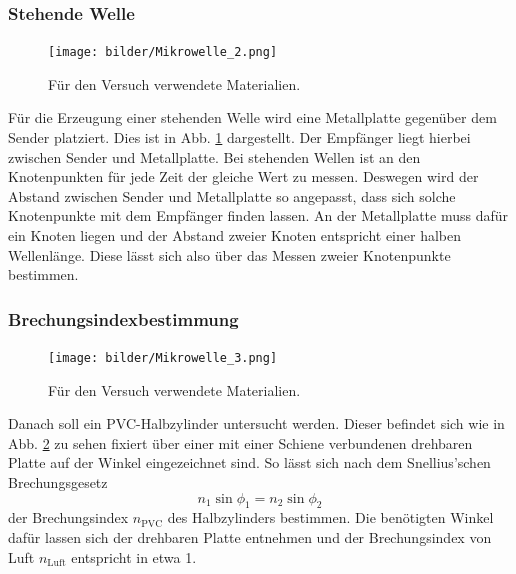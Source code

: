 		\subsubsection*{Stehende Welle}
		\begin{figure}[ht]
			\centering
			\texttt{[image: bilder/Mikrowelle\_2.png]}
			\caption{Für den Versuch verwendete Materialien.\cite{WWU}}
			\label{fig:Aufbau2}	
		\end{figure}
		Für die Erzeugung einer stehenden Welle wird eine Metallplatte gegenüber dem Sender platziert. 
		Dies ist in Abb. \ref{fig:Aufbau2} dargestellt.
		Der Empfänger liegt hierbei zwischen Sender und Metallplatte. 
		Bei stehenden Wellen ist an den Knotenpunkten für jede Zeit der gleiche Wert zu messen.
		Deswegen wird der Abstand zwischen Sender und Metallplatte so angepasst, dass sich solche Knotenpunkte mit dem Empfänger finden lassen.
		An der Metallplatte muss dafür ein Knoten liegen und der Abstand zweier Knoten entspricht einer halben Wellenlänge.
		Diese lässt sich also über das Messen zweier Knotenpunkte bestimmen.
		
		\subsubsection*{Brechungsindexbestimmung}
		\begin{figure}[ht]
			\centering
			\texttt{[image: bilder/Mikrowelle\_3.png]}
			\caption{Für den Versuch verwendete Materialien.\cite{WWU}}
			\label{fig:Aufbau3}	
		\end{figure}
		Danach soll ein PVC-Halbzylinder untersucht werden. 
		Dieser befindet sich wie in Abb. \ref{fig:Aufbau3} zu sehen fixiert über einer mit einer Schiene verbundenen drehbaren Platte auf der Winkel eingezeichnet sind.
		So lässt sich nach dem Snellius'schen Brechungsgesetz
		\begin{equation}
			n_1 \sin{\phi_1} = n_2 \sin{\phi_2}
		\end{equation}
		der Brechungsindex $n_\text{PVC}$ des Halbzylinders bestimmen. 
		Die benötigten Winkel dafür lassen sich der drehbaren Platte entnehmen und der Brechungsindex von Luft $n_\text{Luft}$ entspricht in etwa 1.
		
